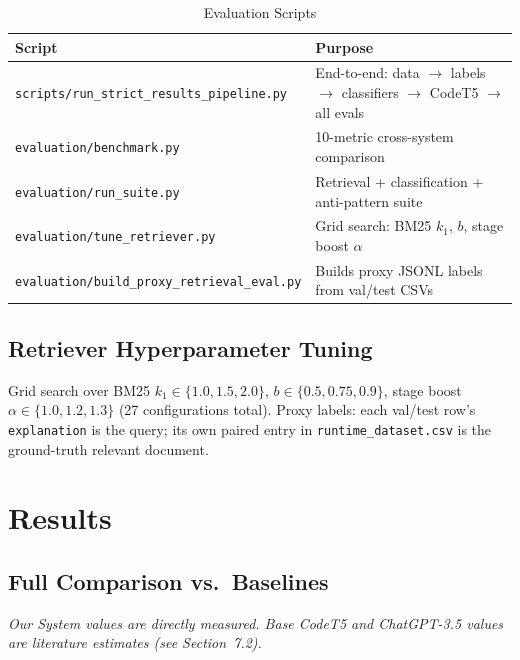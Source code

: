 \documentclass[12pt,a4paper]{article}
\begin{document}
\begin{table}[h!]
\centering
\caption{Evaluation Scripts}
\begin{tabular}{ll}
\toprule
Script & Purpose \\
\midrule
\texttt{scripts/run\_strict\_results\_pipeline.py} & End-to-end: data $\to$ labels $\to$ classifiers $\to$ CodeT5 $\to$ all evals \\
\texttt{evaluation/benchmark.py} & 10-metric cross-system comparison \\
\texttt{evaluation/run\_suite.py} & Retrieval + classification + anti-pattern suite \\
\texttt{evaluation/tune\_retriever.py} & Grid search: BM25 $k_1$, $b$, stage boost $\alpha$ \\
\texttt{evaluation/build\_proxy\_retrieval\_eval.py} & Builds proxy JSONL labels from val/test CSVs \\
\bottomrule
\end{tabular}
\end{table}

\subsection{Retriever Hyperparameter Tuning}

Grid search over BM25 $k_1 \in \{1.0, 1.5, 2.0\}$, $b \in \{0.5, 0.75, 0.9\}$, stage boost $\alpha \in \{1.0, 1.2, 1.3\}$ (27 configurations total). Proxy labels: each val/test row's \texttt{explanation} is the query; its own paired entry in \texttt{runtime\_dataset.csv} is the ground-truth relevant document.

\section{Results}

\subsection{Full Comparison vs.\ Baselines}

\textit{Our System values are directly measured. Base CodeT5 and ChatGPT-3.5 values are literature estimates (see Section~7.2).}
\end{document}
